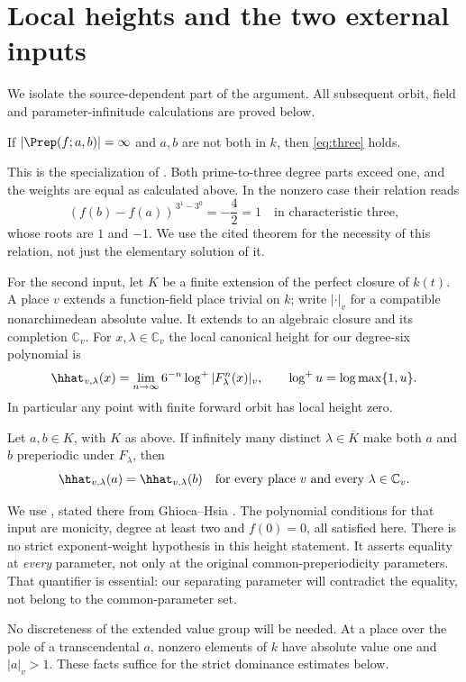 \section{Local heights and the two external inputs}\label{sec:inputs}

We isolate the source-dependent part of the argument. All subsequent
orbit, field and parameter-infinitude calculations are proved below.

\begin{proposition}\label{prop:reduction}
If $|\Prep(f;a,b)|=\infty$ and $a,b$ are not both in $k$, then
\eqref{eq:three} holds.
\end{proposition}

This is the specialization of \citet[Theorem~1.5, proved as
Theorem~4.4]{LeeNam2025}. Both prime-to-three degree parts exceed one,
and the weights are equal as calculated above. In the nonzero case
their relation reads
\[
 (f(b)-f(a))^{\,3^1-3^0}=-\frac{4}{2}=1
 \quad\text{in characteristic three},
\]
whose roots are $1$ and $-1$. We use the cited theorem for the
necessity of this relation, not just the elementary solution of it.

For the second input, let $K$ be a finite extension of the perfect
closure of $k(t)$. A place $v$ extends a function-field place trivial
on $k$; write $|\cdot|_v$ for a compatible nonarchimedean absolute
value. It extends to an algebraic closure and its completion
$\mathbb C_v$. For $x,\lambda\in\mathbb C_v$ the local canonical
height for our degree-six polynomial is
\begin{equation}\label{eq:height}
 \hhat_{v,\lambda}(x)
 =\lim_{n\to\infty}6^{-n}\log^+|F_\lambda^n(x)|_v,\qquad
 \log^+u=\log\max\{1,u\}.
\end{equation}
In particular any point with finite forward orbit has local height zero.

\begin{proposition}\label{prop:heights}
Let $a,b\in K$, with $K$ as above. If infinitely many distinct
$\lambda\in\overline K$ make both $a$ and $b$ preperiodic under
$F_\lambda$, then
\begin{equation}\label{eq:equalheight}
 \hhat_{v,\lambda}(a)=\hhat_{v,\lambda}(b)
 \quad\text{for every place }v
 \text{ and every }\lambda\in\mathbb C_v .
\end{equation}
\end{proposition}

We use \citet[Theorem~2.1]{LeeNam2025}, stated there from
Ghioca--Hsia \citep[Theorem~2.13]{GhiocaHsia2026}.
The polynomial conditions for that input are monicity, degree at
least two and $f(0)=0$, all satisfied here. There is no strict
exponent-weight hypothesis in this height statement. It asserts
equality at \emph{every} parameter, not only at the original
common-preperiodicity parameters. That quantifier is essential:
our separating parameter will contradict the equality, not belong
to the common-parameter set.

No discreteness of the extended value group will be needed. At a
place over the pole of a transcendental $a$, nonzero elements of $k$
have absolute value one and $|a|_v>1$. These facts suffice for the
strict dominance estimates below.
